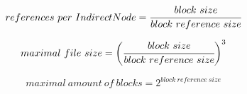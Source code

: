 \documentclass[JCDReport.tex]{subfiles}
\begin{document}
\begin{equation}
references\ per\ Indirect Node = \cfrac{block\ size}{block\ reference\ size}
\end{equation}

\begin{equation}
\begin{split}
maximal\ file\ size =
  \bigg(\cfrac{block\ size}{block\ reference\ size}\bigg)^3\\
\end{split}
\end{equation}

\begin{equation}
maximal\ amount\ of\ blocks = 2^{block\ reference\ size}
\end{equation}
\end{document}
